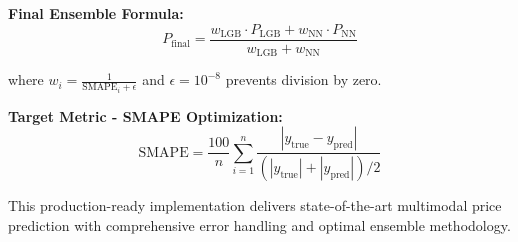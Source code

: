 \documentclass[10pt,a4paper]{article}
\begin{document}
\vspace{0.2cm}

\textbf{Final Ensemble Formula:}
\begin{equation}
P_{\text{final}} = \frac{w_{\text{LGB}} \cdot P_{\text{LGB}} + w_{\text{NN}} \cdot P_{\text{NN}}}{w_{\text{LGB}} + w_{\text{NN}}}
\end{equation}

where $w_i = \frac{1}{\text{SMAPE}_i + \epsilon}$ and $\epsilon = 10^{-8}$ prevents division by zero.

\vspace{0.3cm}

\textbf{Target Metric - SMAPE Optimization:}
\begin{equation}
\text{SMAPE} = \frac{100}{n} \sum_{i=1}^{n} \frac{|y_{\text{true}} - y_{\text{pred}}|}{(|y_{\text{true}}| + |y_{\text{pred}}|)/2}
\end{equation}

This production-ready implementation delivers state-of-the-art multimodal price prediction with comprehensive error handling and optimal ensemble methodology.
\end{document}
